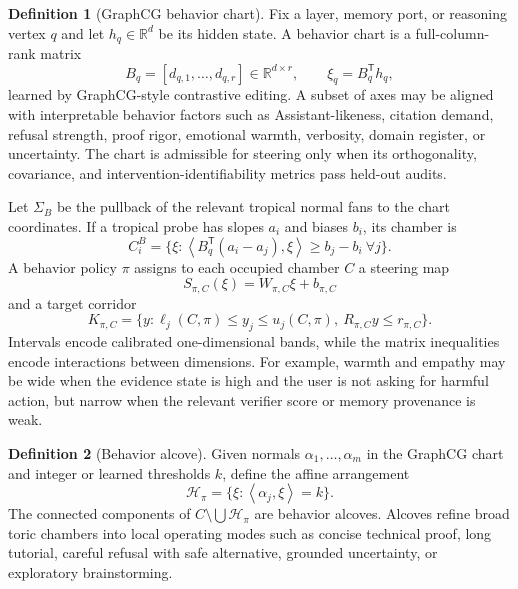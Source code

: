 \documentclass[11pt]{article}
\theoremstyle{definition}
\newtheorem{definition}{Definition}[section]
\theoremstyle{plain}
\theoremstyle{remark}
\numberwithin{equation}{section}
\newcommand{\R}{\mathbb{R}}
\newcommand{\ip}[2]{\left\langle #1,#2\right\rangle}
\newcommand{\transpose}{^{\mathsf T}}
\begin{document}
\begin{definition}[GraphCG behavior chart]
Fix a layer, memory port, or reasoning vertex $q$ and let $h_q\in\R^d$ be its hidden state.  A behavior chart is a full-column-rank matrix
\begin{equation}
  B_q=[d_{q,1},\ldots,d_{q,r}]\in\R^{d\times r},
  \qquad
  \xi_q=B_q\transpose h_q ,
\end{equation}
learned by GraphCG-style contrastive editing.  A subset of axes may be aligned with interpretable behavior factors such as Assistant-likeness, citation demand, refusal strength, proof rigor, emotional warmth, verbosity, domain register, or uncertainty.  The chart is admissible for steering only when its orthogonality, covariance, and intervention-identifiability metrics pass held-out audits.
\end{definition}

Let $\Sigma_B$ be the pullback of the relevant tropical normal fans to the chart coordinates.  If a tropical probe has slopes $a_i$ and biases $b_i$, its chamber is
\begin{equation}
  C_i^B=\{\xi:\ip{B_q\transpose(a_i-a_j)}{\xi}\ge b_j-b_i\ \forall j\}.
\end{equation}
A behavior policy $\pi$ assigns to each occupied chamber $C$ a steering map
\begin{equation}
  S_{\pi,C}(\xi)=W_{\pi,C}\xi+b_{\pi,C}
\end{equation}
and a target corridor
\begin{equation}
  K_{\pi,C}=\{y:\ell_j(C,\pi)\le y_j\le u_j(C,\pi),\ R_{\pi,C}y\le r_{\pi,C}\}.
\end{equation}
Intervals encode calibrated one-dimensional bands, while the matrix inequalities encode interactions between dimensions.  For example, warmth and empathy may be wide when the evidence state is high and the user is not asking for harmful action, but narrow when the relevant verifier score or memory provenance is weak.

\begin{definition}[Behavior alcove]
Given normals $\alpha_1,\ldots,\alpha_m$ in the GraphCG chart and integer or learned thresholds $k$, define the affine arrangement
\begin{equation}
  \mathcal H_\pi=\{\xi:\ip{\alpha_j}{\xi}=k\}.
\end{equation}
The connected components of $C\setminus\bigcup\mathcal H_\pi$ are behavior alcoves.  Alcoves refine broad toric chambers into local operating modes such as concise technical proof, long tutorial, careful refusal with safe alternative, grounded uncertainty, or exploratory brainstorming.
\end{definition}
\end{document}
